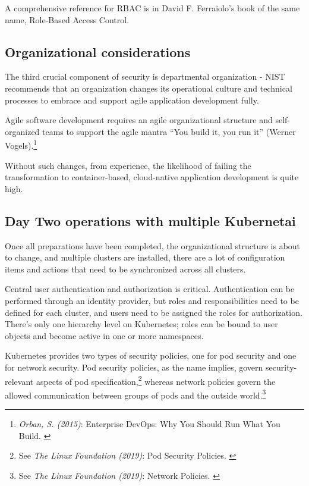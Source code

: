 A comprehensive reference for RBAC is in David F. Ferraiolo's book of the same name, Role-Based Access Control\cite{rbac}.

\subsection{Organizational considerations}

The third crucial component of security is departmental organization - NIST recommends that an organization changes its operational culture and technical processes to embrace and support agile application development fully.

Agile software development requires an agile organizational structure and self-organized teams to support the agile mantra “You build it, you run it” (Werner Vogels).\footnote{\textit{Orban, S. (2015)}: Enterprise DevOps: Why You Should Run What You Build. \cite{devOps}}

Without such changes, from experience, the likelihood of failing the transformation to container-based, cloud-native application development is quite high.

\subsection{Day Two operations with multiple Kubernetai}

Once all preparations have been completed, the organizational structure is about to change, and multiple clusters are installed, there are a lot of configuration items and actions that need to be synchronized across all clusters.

Central user authentication and authorization is critical. Authentication can be performed through an identity provider, but roles and responsibilities need to be defined for each cluster, and users need to be assigned the roles for authorization. There's only one hierarchy level on Kubernetes; roles can be bound to user objects and become active in one or more namespaces.

Kubernetes provides two types of security policies, one for pod security and one for network security. Pod security policies, as the name implies, govern security-relevant aspects of pod specification,\footnote{See \textit{The Linux Foundation (2019)}: Pod Security Policies. \cite{podSecurity}} whereas network policies govern the allowed communication between groups of pods and the outside world.\footnote{See \textit{The Linux Foundation (2019)}: Network Policies. \cite{netSecurity}}

